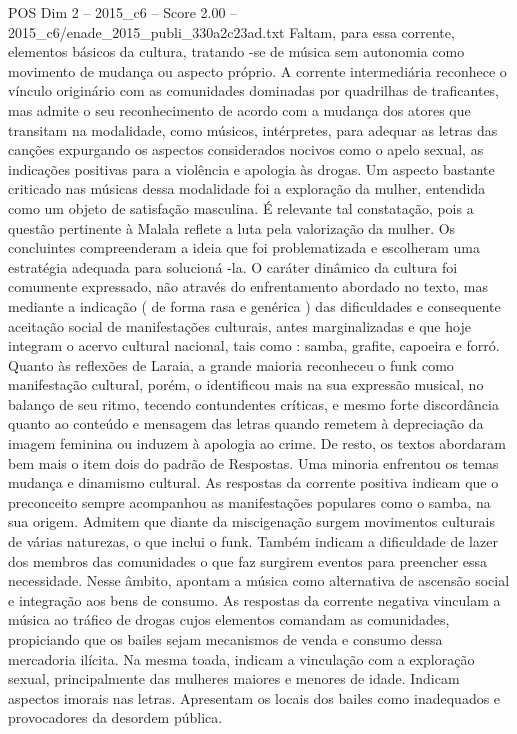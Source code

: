 \begin{textsample}{POS Dim 2 – 2015\_c6 – Score 2.00 – 2015\_c6/enade\_2015\_publi\_330a2c23ad.txt}
Faltam, para essa corrente, elementos básicos da cultura, tratando -se de música sem autonomia como movimento de mudança ou aspecto próprio.
A corrente intermediária reconhece o vínculo originário com as comunidades dominadas por quadrilhas de traficantes, mas admite o seu reconhecimento de acordo com a mudança dos atores que transitam na modalidade, como músicos, intérpretes, para adequar as letras das canções expurgando os aspectos considerados nocivos como o apelo sexual, as indicações positivas para a violência e apologia às drogas.
Um aspecto bastante criticado nas músicas dessa modalidade foi a exploração da mulher, entendida como um objeto de satisfação masculina.
É relevante tal constatação, pois a questão pertinente à Malala reflete a luta pela valorização da mulher.
Os concluintes compreenderam a ideia que foi problematizada e escolheram uma estratégia adequada para solucioná -la.
O caráter dinâmico da cultura foi comumente expressado, não através do enfrentamento abordado no texto, mas mediante a indicação ( de forma rasa e genérica ) das dificuldades e consequente aceitação social de manifestações culturais, antes marginalizadas e que hoje integram o acervo cultural nacional, tais como : samba, grafite, capoeira e forró.
Quanto às reflexões de Laraia, a grande maioria reconheceu o funk como manifestação cultural, porém, o identificou mais na sua expressão musical, no balanço de seu ritmo, tecendo contundentes críticas, e mesmo forte discordância quanto ao conteúdo e mensagem das letras quando remetem à depreciação da imagem feminina ou induzem à apologia ao crime.
De resto, os textos abordaram bem mais o item dois do padrão de Respostas.
Uma minoria enfrentou os temas mudança e dinamismo cultural.
As respostas da corrente positiva indicam que o preconceito sempre acompanhou as manifestações populares como o samba, na sua origem.
Admitem que diante da miscigenação surgem movimentos culturais de várias naturezas, o que inclui o funk.
Também indicam a dificuldade de lazer dos membros das comunidades o que faz surgirem eventos para preencher essa necessidade.
Nesse âmbito, apontam a música como alternativa de ascensão social e integração aos bens de consumo.
As respostas da corrente negativa vinculam a música ao tráfico de drogas cujos elementos comandam as comunidades, propiciando que os bailes sejam mecanismos de venda e consumo dessa mercadoria ilícita.
Na mesma toada, indicam a vinculação com a exploração sexual, principalmente das mulheres maiores e menores de idade.
Indicam aspectos imorais nas letras.
Apresentam os locais dos bailes como inadequados e provocadores da desordem pública.

\end{textsample}
